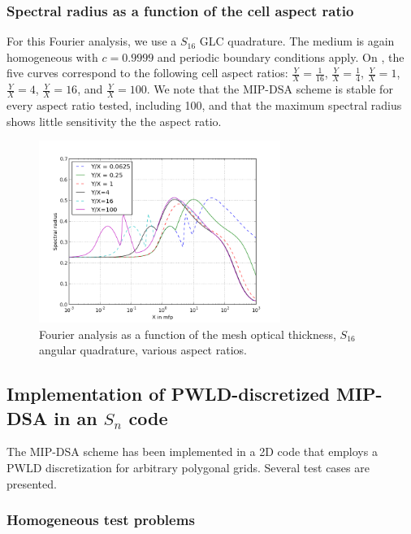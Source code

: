\subsubsection{Spectral radius as a function of the cell aspect ratio}
For this Fourier analysis, we use a $S_{16}$ GLC quadrature. The medium is
again homogeneous with $c=0.9999$ and periodic boundary conditions apply. 
On , the five curves correspond to the following cell aspect 
ratios: $\frac{Y}{X}=\frac{1}{16}$, $\frac{Y}{X}=\frac{1}{4}$,
$\frac{Y}{X}=1$, $\frac{Y}{X}=4$, $\frac{Y}{X}=16$, and $\frac{Y}{X}=100$.
We note that the MIP-DSA scheme is stable for every aspect ratio tested, including 100, 
and that the maximum spectral radius shows little sensitivity the the aspect ratio.
\begin{figure}[!htbp]
  \centering
  \includegraphics[width=0.7\textwidth]{aspect_ratio_9999_2}
  \caption{Fourier analysis as a function of the mesh optical thickness,
  $S_{16}$ angular quadrature, various aspect ratios.}
  \label{fig_fa_ar}
\end{figure}

\subsection{Implementation of PWLD-discretized MIP-DSA in an $S_n$ code}
The MIP-DSA scheme has been implemented in a 2D \sn code that employs a PWLD discretization
for arbitrary polygonal grids. Several test cases are presented.

\subsubsection{Homogeneous test problems}  \label{sec_homog}


